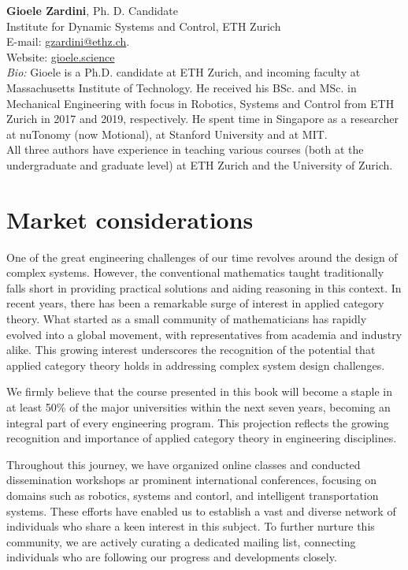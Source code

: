 \documentclass[10pt, article, one side]{memoir}
\begin{document}
    \noindent \textbf{Gioele Zardini}, Ph.
    D.
    Candidate\\
    Institute for Dynamic Systems and Control, ETH Zurich\\
    E-mail: \href{mailto:gzardini@ethz.ch}{gzardini@ethz.ch}.
    \\
    Website: \href{https://gioele.science}{gioele.science}\\
    \emph{Bio:}
    Gioele is a Ph.D.
    candidate at ETH Zurich, and incoming faculty at Massachusetts Institute of Technology.
    He received his BSc.
    and MSc. in Mechanical Engineering with focus in Robotics, Systems and Control from ETH Zurich in 2017 and 2019, respectively.
    He spent time in Singapore as a researcher at nuTonomy (now Motional), at Stanford University and at MIT.
    \\

    All three authors have experience in teaching various courses (both at the undergraduate and graduate level) at ETH Zurich and the University of Zurich.

    \section{Market considerations}
    One of the great engineering challenges of our time revolves around the design of complex systems.
    However, the conventional mathematics taught traditionally falls short in providing practical solutions and aiding reasoning in this context.
    In recent years, there has been a remarkable surge of interest in applied category theory.
    What started as a small community of mathematicians has rapidly evolved into a global movement, with representatives from academia and industry alike.
    This growing interest underscores the recognition of the potential that applied category theory holds in addressing complex system design challenges.

    We firmly believe that the course presented in this book will become a staple in at least 50\% of the major universities within the next seven years, becoming an integral part of every engineering program.
    This projection reflects the growing recognition and importance of applied category theory in engineering disciplines.

    Throughout this journey, we have organized online classes and conducted dissemination workshops ar prominent international conferences, focusing on domains such as robotics, systems and contorl, and intelligent transportation systems.
    These efforts have enabled us to establish a vast and diverse network of individuals who share a keen interest in this subject.
    To further nurture this community, we are actively curating a dedicated mailing list, connecting individuals who are following our progress and developments closely.
\end{document}
